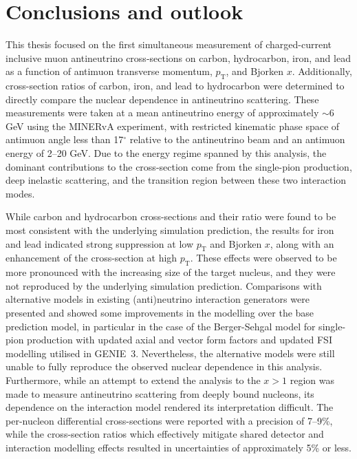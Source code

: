 \chapter{Conclusions and outlook}

\label{ch:conclusions}


This thesis focused on the first simultaneous measurement of charged-current inclusive muon antineutrino cross-sections on carbon, hydrocarbon, iron, and lead as a function of antimuon transverse momentum, $p_{\text{T}}$, and Bjorken $x$. Additionally, cross-section ratios of carbon, iron, and lead to hydrocarbon were determined to directly compare the nuclear dependence in antineutrino scattering. These measurements were taken at a mean antineutrino energy of approximately $\sim$6 GeV using the MINERvA experiment, with restricted kinematic phase space of antimuon angle less than 17$^\circ$ relative to the antineutrino beam and an antimuon energy of 2--20 GeV. Due to the energy regime spanned by this analysis, the dominant contributions to the cross-section come from the single-pion production, deep inelastic scattering, and the transition region between these two interaction modes. 

While carbon and hydrocarbon cross-sections and their ratio were found to be most consistent with the underlying simulation prediction, the results for iron and lead indicated strong suppression at low $p_{\text{T}}$ and Bjorken $x$, along with an enhancement of the cross-section at high $p_{\text{T}}$. These effects were observed to be more pronounced with the increasing size of the target nucleus, and they were not reproduced by the underlying simulation prediction. Comparisons with alternative models in existing (anti)neutrino interaction generators were presented and showed some improvements in the modelling over the base prediction model, in particular in the case of the Berger-Sehgal model for single-pion production with updated axial and vector form factors and updated FSI modelling utilised in GENIE~3. Nevertheless, the alternative models were still unable to fully reproduce the observed nuclear dependence in this analysis. Furthermore, while an attempt to extend the analysis to the $x > 1$ region was made to measure antineutrino scattering from deeply bound nucleons, its dependence on the interaction model rendered its interpretation difficult. The per-nucleon differential cross-sections were reported with a precision of 7--9\%, while the cross-section ratios which effectively mitigate shared detector and interaction modelling effects resulted in uncertainties of approximately 5\% or less.

